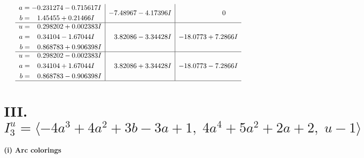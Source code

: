 \documentclass[1p]{elsarticle_modified}
\theoremstyle{definition}
\begin{document}
$$\begin{array}{c|c|c}
\begin{aligned}
a &= -0.231274 - 0.715617 I \\
b &= \phantom{-}1.45455 + 0.21466 I\end{aligned}
 & -7.48967 - 4.17396 I & \phantom{-0.000000 } 0 \\ \hline\begin{aligned}
u &= \phantom{-}0.298202 + 0.002383 I \\
a &= \phantom{-}0.34104 - 1.67044 I \\
b &= \phantom{-}0.868783 + 0.906398 I\end{aligned}
 & \phantom{-}3.82086 - 3.34428 I & -18.0773 + 7.2866 I \\ \hline\begin{aligned}
u &= \phantom{-}0.298202 - 0.002383 I \\
a &= \phantom{-}0.34104 + 1.67044 I \\
b &= \phantom{-}0.868783 - 0.906398 I\end{aligned}
 & \phantom{-}3.82086 + 3.34428 I & -18.0773 - 7.2866 I\\
 \hline 
 \end{array}$$\newpage\newpage\renewcommand{\arraystretch}{1}
\centering \section*{III. $I^u_{3}= \langle -4 a^3+4 a^2+3 b-3 a+1,\;4 a^4+5 a^2+2 a+2,\;u-1 \rangle$}
\flushleft \textbf{(i) Arc colorings}\\
\end{document}
